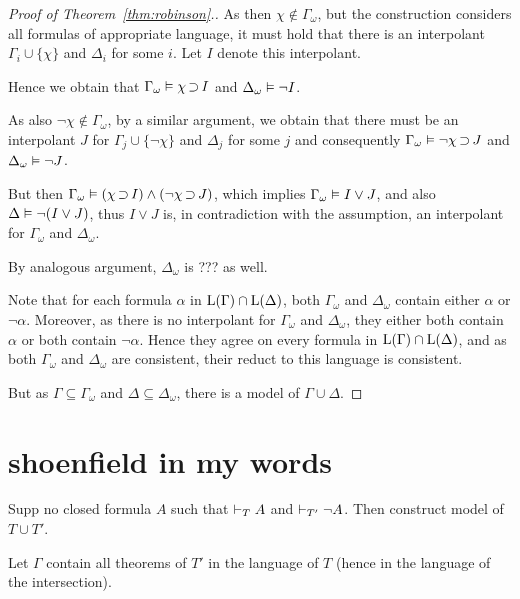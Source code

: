 \begin{proof}[Proof of Theorem~\ref{thm:robinson}.]
As then $\chi \not\in \Gamma_\omega$, but the construction considers all formulas of appropriate language, it must hold that there is an interpolant $\Gamma_i \cup \{\chi\}$ and $\Delta_i$ for some $i$.
Let $I$ denote this interpolant.

Hence we obtain that $\Gamma_\omega \vDash \chi \operatorname{\supset} I$ 
and $\Delta_\omega \vDash \lnot I$.

As also $\lnot\chi \not\in \Gamma_\omega$, by a similar argument, we obtain that 
there must be an interpolant $J$ for $\Gamma_j \cup \{\lnot \chi\}$ and $\Delta_j$ for some $j$ and consequently
$\Gamma_\omega \vDash \lnot \chi \operatorname{\supset} J$ 
and $\Delta_\omega \vDash \lnot J$.

But then
$\Gamma_\omega \vDash (\chi \operatorname{\supset} I) \land (\lnot \chi \operatorname{\supset} J)$, which implies $\Gamma_\omega \vDash I\lor J$, and also $\Delta\vDash \lnot (I \lor J)$, thus $I\lor J$ is, in contradiction with the assumption, an interpolant for $\Gamma_\omega$ and $\Delta_\omega$.

By analogous argument, $\Delta_\omega$ is ??? as well. 

Note that for each formula $\alpha$ in $\operatorname{L}(\Gamma) \cap \operatorname{L}(\Delta)$,
both $\Gamma_\omega$ and $\Delta_\omega$ contain either $\alpha$ or $\lnot \alpha$.
Moreover, as there is no interpolant for $\Gamma_\omega$ and $\Delta_\omega$, they either both contain $\alpha$ or both contain $\lnot \alpha$.
Hence they agree on every formula in $\operatorname{L}(\Gamma) \cap \operatorname{L}(\Delta)$, and as both $\Gamma_\omega$ and $\Delta_\omega$ are consistent, their reduct to this language is consistent.

But as $\Gamma \subseteq \Gamma_\omega$ and 
$\Delta \subseteq \Delta_\omega$, there is a model of $\Gamma \cup \Delta$.






\end{proof}


\clearpage


\section{shoenfield in my words}

Supp no closed formula $A$ such that $\vdash_T A$ and $\vdash_{T'} \lnot A$.
Then construct model of $T\cup T'$.

Let $\Gamma$ contain all theorems of $T'$ in the language of $T$ (hence in the language of the intersection).

